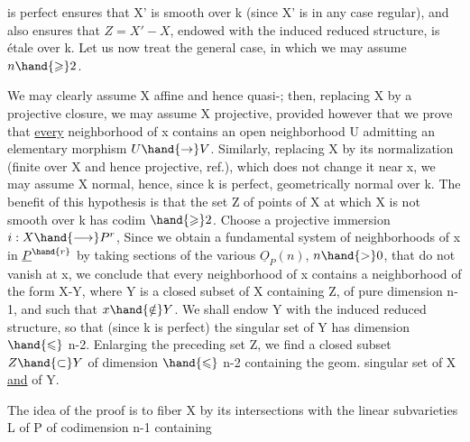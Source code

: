
 is perfect ensures that X' is smooth over k (since X' is in any case
regular), and also ensures that $Z = X' - X$, endowed with the induced reduced
structure, is étale over k. Let us now treat the general case,
in which we may assume $n \hand{\geqslant} 2$.

 We may clearly assume
X  affine and hence quasi-; then, replacing X
by a projective closure, we may assume X projective, provided
however that we prove that \uline{every} neighborhood of x contains an open
neighborhood U admitting an elementary morphism $U \hand{\to} V$. Similarly, replacing
X by its normalization (finite over X and hence projective, ref.), which does not
change it near x, we may assume X normal, hence, since k is
perfect, geometrically normal over k.  The
benefit of this hypothesis is that the set Z of points of X at
which X is not smooth over k has codim $\hand{\geqslant} 2$. 
Choose a projective immersion $i : X \hand{\longrightarrow} P^r$, 
 Since we obtain a fundamental
system of neighborhoods of x in $\underline{P}^{\hand{r}}$ by taking sections of the various
$\underline{O}_P(n)$, $n \hand{>} 0$, that do not vanish at x, we conclude that every
neighborhood of x contains a neighborhood of the form X-Y, where Y is a
closed subset of X containing Z, of pure dimension n-1, and such that
$x \hand{\notin} Y$. We shall endow Y with the induced reduced structure, so that
(since k is perfect) the singular set of Y has dimension $\hand{\leqslant}$ n-2. 
Enlarging the preceding set Z, we find a closed subset $Z \hand{\subset} Y$ of
dimension $\hand{\leqslant}$ n-2 containing the geom. singular set of X \uline{and} of Y.

The idea of the proof is to fiber X by its intersections
with the linear subvarieties L of P of codimension n-1 containing


